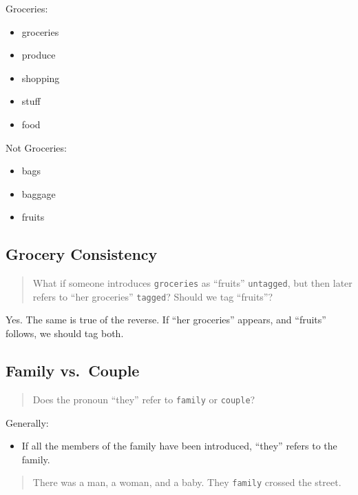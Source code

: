 \documentclass[
]{book}
\providecommand{\tightlist}{%
  \setlength{\itemsep}{0pt}\setlength{\parskip}{0pt}}
\begin{document}
Groceries:

\begin{itemize}
\tightlist
\item
  groceries
\item
  produce
\item
  shopping
\item
  stuff
\item
  food
\end{itemize}

Not Groceries:

\begin{itemize}
\tightlist
\item
  bags
\item
  baggage
\item
  fruits
\end{itemize}

\hypertarget{grocery-consistency}{%
\subsection{Grocery Consistency}\label{grocery-consistency}}

\begin{quote}
What if someone introduces \texttt{groceries} as ``fruits'' \texttt{untagged},
but then later refers to ``her groceries'' \texttt{tagged}?
Should we tag ``fruits''?
\end{quote}

Yes. The same is true of the reverse.
If ``her groceries'' appears, and ``fruits'' follows, we should tag both.

\hypertarget{family-vs.-couple}{%
\subsection{Family vs.~Couple}\label{family-vs.-couple}}

\begin{quote}
Does the pronoun ``they'' refer to \texttt{family} or \texttt{couple}?
\end{quote}

Generally:

\begin{itemize}
\tightlist
\item
  If all the members of the family have been introduced,
  ``they'' refers to the family.
\end{itemize}

\begin{quote}
There was a man, a woman, and a baby.
They \texttt{family} crossed the street.
\end{quote}
\end{document}
